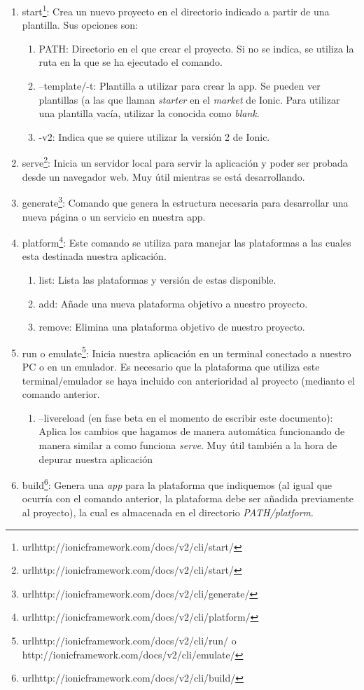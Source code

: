 \begin{enumerate}
  \item start\footnote{url{http://ionicframework.com/docs/v2/cli/start/}}: Crea un nuevo proyecto en el directorio indicado a partir de una plantilla. Sus opciones son:
  \begin{enumerate}
    \item PATH: Directorio en el que crear el proyecto. Si no se indica, se utiliza la ruta en la que se ha ejecutado el comando.
    \item --template/-t: Plantilla a utilizar para crear la app. Se pueden ver plantillas (a las que llaman \emph{starter} en el \emph{market} de Ionic. Para utilizar una plantilla vacía, utilizar la conocida como \emph{blank}.
    \item -v2: Indica que se quiere utilizar la versión 2 de Ionic.
  \end{enumerate}
  \item serve\footnote{url{http://ionicframework.com/docs/v2/cli/start/}}: Inicia un servidor local para servir la aplicación y poder ser probada desde un navegador web. Muy útil mientras se está desarrollando.
  \item generate\footnote{url{http://ionicframework.com/docs/v2/cli/generate/}}: Comando que genera la estructura necesaria para desarrollar una nueva página o un servicio en nuestra app.
  \item platform\footnote{url{http://ionicframework.com/docs/v2/cli/platform/}}: Este comando se utiliza para manejar las plataformas a las cuales esta destinada nuestra aplicación.
  \begin{enumerate}
    \item list: Lista las plataformas y versión de estas disponible.
    \item add: Añade una nueva plataforma objetivo a nuestro proyecto.
    \item remove: Elimina una plataforma objetivo de nuestro proyecto.
  \end{enumerate}
  \item run o emulate\footnote{url{http://ionicframework.com/docs/v2/cli/run/ o http://ionicframework.com/docs/v2/cli/emulate/}}: Inicia nuestra aplicación en un terminal conectado a nuestro PC o en un emulador. Es necesario que la plataforma que utiliza este terminal/emulador se haya incluido con anterioridad al proyecto (medianto el comando anterior.
  \begin{enumerate}
    \item --livereload (en fase beta en el momento de escribir este documento): Aplica los cambios que hagamos de manera automática funcionando de manera similar a como funciona \emph{serve}. Muy útil también a la hora de depurar nuestra aplicación
  \end{enumerate}
  \item build\footnote{url{http://ionicframework.com/docs/v2/cli/build/}}: Genera una \emph{app} para la plataforma que indiquemos (al igual que ocurría con el comando anterior, la plataforma debe ser añadida previamente al proyecto), la cual es almacenada en el directorio \emph{PATH/platform}.
\end{enumerate}

